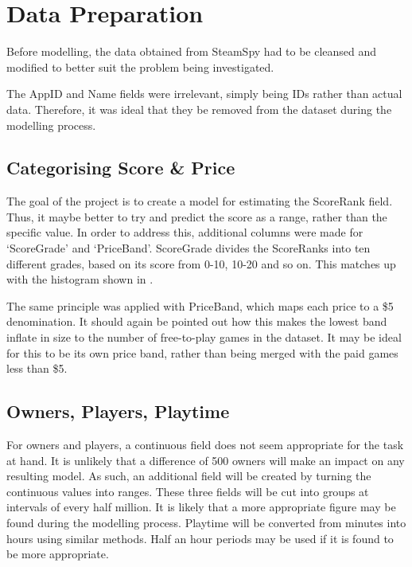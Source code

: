 \documentclass[preparation.tex]{subfiles}
\begin{document}
\section{Data Preparation} %
\label{sec:preparation}
Before modelling, the data obtained from SteamSpy had to be cleansed and
modified to better suit the problem being investigated.

The AppID and Name fields were irrelevant, simply being IDs rather than actual
data. Therefore, it was ideal that they be removed from the dataset during the
modelling process.

\subsection{Categorising Score \& Price} %
\label{sub:categorising_score_price}
The goal of the project is to create a model for estimating the ScoreRank
field. Thus, it maybe better to try and predict the score as a range, rather
than the specific value. In order to address this, additional columns were made
for `ScoreGrade' and `PriceBand'. ScoreGrade divides the ScoreRanks into ten
different grades, based on its score from 0-10, 10-20 and so on. This matches
up with the histogram shown in .

The same principle was applied with PriceBand, which maps each price to a \$5
denomination. It should again be pointed out how this makes the lowest band
inflate in size to the number of free-to-play games in the dataset. It may be
ideal for this to be its own price band, rather than being merged with the paid
games less than \$5.

\subsection{Owners, Players, Playtime} %
\label{sub:owners_players_playtime}
For owners and players, a continuous field does not seem appropriate for the
task at hand. It is unlikely that a difference of 500 owners will make an
impact on any resulting model. As such, an additional field will be created by
turning the continuous values into ranges. These three fields will be cut into
groups at intervals of every half million. It is likely that a more appropriate
figure may be found during the modelling process. Playtime will be converted
from minutes into hours using similar methods. Half an hour periods may be used
if it is found to be more appropriate.
\end{document}
